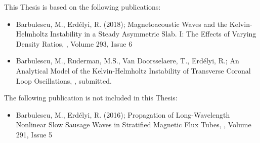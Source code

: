 \begin{publications}

This Thesis is based on the following publications:

\begin{itemize}
\item Barbulescu, M., Erd\'elyi, R. (2018); Magnetoacoustic Waves and the Kelvin-Helmholtz Instability in a Steady Asymmetric Slab. I: The Effects of Varying Density Ratios, \solphys, Volume 293, Issue 6
\item Barbulescu, M., Ruderman, M.S., Van Doorsselaere, T., Erd\'elyi, R.; An Analytical Model of the Kelvin-Helmholtz Instability of Transverse Coronal Loop Oscillations, \apj, submitted.
\end{itemize}

The following publication is not included in this Thesis:

\begin{itemize}
\item Barbulescu, M., Erd\'elyi, R. (2016); Propagation of Long-Wavelength Nonlinear Slow Sausage Waves in Stratified Magnetic Flux Tubes, \solphys, Volume 291, Issue 5
\end{itemize}

\end{publications}